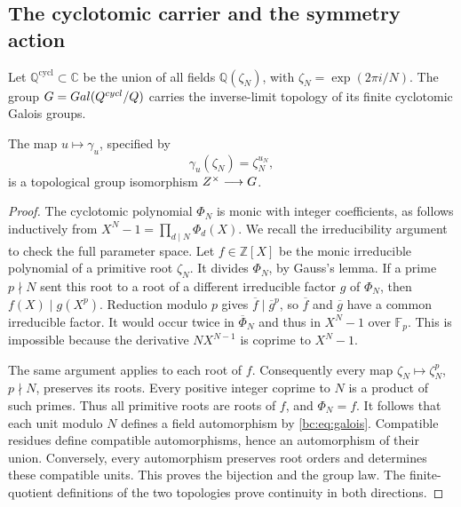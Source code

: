 \subsection{The cyclotomic carrier and the symmetry action}

Let \(\mathbb Q^{\mathrm{cycl}}\subset\mathbb C\) be the union of all
fields \(\mathbb Q(\zeta_N)\), with \(\zeta_N=\exp(2\pi i/N)\).
The group \(G=Gal(Q^{cycl}/Q)\) carries
the inverse-limit topology of its finite cyclotomic Galois groups.

\begin{lemma}\label{bc:lem:galois}
The map \(u\mapsto\gamma_u\), specified by
\begin{equation}\label{bc:eq:galois}
 \gamma_u(\zeta_N)=\zeta_N^{u_N},
\end{equation}
is a topological group isomorphism \(Z^{\times}\longrightarrow G\).
\end{lemma}

\begin{proof}
The cyclotomic polynomial \(\Phi_N\) is monic with integer coefficients,
as follows inductively from \(X^N-1=\prod_{d\mid N}\Phi_d(X)\).
We recall the irreducibility argument to check the full parameter space.
Let \(f\in\mathbb Z[X]\) be the monic irreducible polynomial of a
primitive root \(\zeta_N\). It divides \(\Phi_N\), by Gauss's lemma.
If a prime \(p\nmid N\) sent this root to a root of a different
irreducible factor \(g\) of \(\Phi_N\), then
\(f(X)\mid g(X^p)\). Reduction modulo \(p\) gives
\(\overline f\mid\overline g^p\), so \(\overline f\) and
\(\overline g\) have a common irreducible factor.
It would occur twice in \(\overline\Phi_N\) and thus in \(X^N-1\)
over \(\mathbb F_p\). This is impossible because the derivative
\(NX^{N-1}\) is coprime to \(X^N-1\).

The same argument applies to each root of \(f\). Consequently every
map \(\zeta_N\mapsto\zeta_N^p\), \(p\nmid N\), preserves its roots.
Every positive integer coprime to \(N\)
is a product of such primes. Thus all primitive roots are roots of
\(f\), and \(\Phi_N=f\). It follows that each unit modulo \(N\)
defines a field automorphism by \eqref{bc:eq:galois}.
Compatible residues define compatible automorphisms, hence an
automorphism of their union. Conversely, every automorphism preserves
root orders and determines these compatible units. This proves the
bijection and the group law. The finite-quotient definitions of the
two topologies prove continuity in both directions.
\end{proof}

